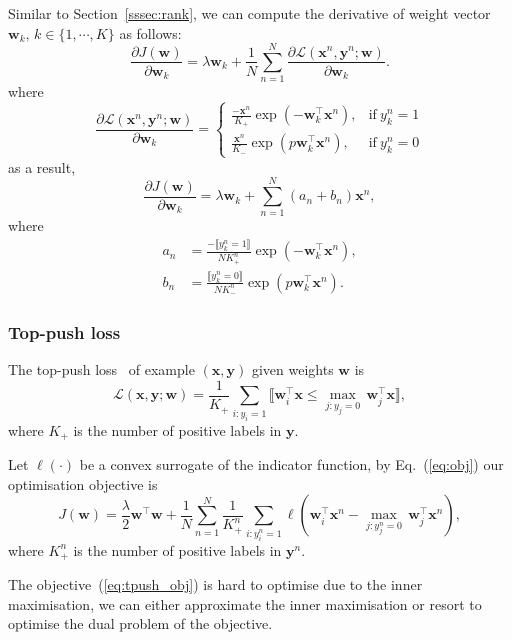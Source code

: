 \documentclass[9pt]{extarticle}
\newcommand{\llb}{\llbracket}
\newcommand{\rrb}{\rrbracket}
\newcommand{\x}{\mathbf{x}}
\newcommand{\y}{\mathbf{y}}
\newcommand{\1}{\mathbf{1}}
\newcommand{\w}{\mathbf{w}}
\newcommand{\LCal}{\mathcal{L}}
\begin{document}
Similar to Section~\ref{sssec:rank}, we can compute the derivative of weight vector $\w_k, \, k \in \{1,\cdots,K\}$ as follows:
$$
\frac{\partial J(\w)} {\partial \w_k} = \lambda \w_k + \frac{1}{N} \sum_{n=1}^N \frac{\partial \LCal(\x^n, \y^n; \w)} {\partial \w_k}.
$$
where
\begin{equation}
\frac{\partial \LCal(\x^n, \y^n; \w)} {\partial \w_k} =
\begin{cases}
\frac{-\x^n}{K_+} \exp(-\w_k^\top \x^n),  & \text{if} \ y_k^n=1 \\
\frac{ \x^n}{K_-} \exp(p\w_k^\top \x^n),  & \text{if} \ y_k^n=0
\end{cases}
\end{equation}
as a result,
\begin{equation}
\label{eq:grad_pclass}
\frac{\partial J(\w)} {\partial \w_k} = \lambda \w_k + \sum_{n=1}^N (a_n + b_n) \x^n,
\end{equation}
where
\begin{align*}
a_n &= \frac{-\llb y_k^n=1 \rrb} {N K_+^n} \exp( -\w_k^\top \x^n), \\
b_n &= \frac{ \llb y_k^n=0 \rrb} {N K_-^n} \exp(p \w_k^\top \x^n).
\end{align*}



\subsubsection{Top-push loss}
\label{sssec:tpush}

The top-push loss~\cite{li2014top} of example $(\x, \y)$ given weights $\w$ is
\begin{equation}
\label{eq:tpush_loss}
\LCal(\x, \y; \w) = \frac{1}{K_+} \sum_{i:y_i=1} \llb \w_i^\top \x \le \underset{j:y_j=0}{\max} \, \w_j^\top \x \rrb,
\end{equation}
where $K_+$ is the number of positive labels in $\y$.

Let $\ell(\cdot)$ be a convex surrogate of the indicator function, by Eq.~(\ref{eq:obj}) our optimisation objective is
\begin{equation}
\label{eq:tpush_obj}
J(\w) = \frac{\lambda}{2} \w^\top \w + \frac{1}{N} \sum_{n=1}^N 
        \frac{1}{K_+^n} \sum_{i:y_i^n=1} \ell \left( \w_i^\top \x^n - \underset{j:y_j^n=0}{\max} \, \w_j^\top \x^n \right),
\end{equation}
where $K_+^n$ is the number of positive labels in $\y^n$.

The objective~(\ref{eq:tpush_obj}) is hard to optimise due to the inner maximisation,
we can either approximate the inner maximisation or resort to optimise the dual problem of the objective.
\end{document}

